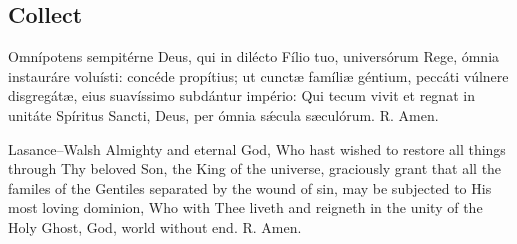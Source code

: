 \subsection{Collect}
\label{proper-collect}
\begin{latinproper}
Omnípotens sempitérne Deus, qui in dilécto Fílio tuo, universórum Rege, ómnia instauráre voluísti: concéde propítius; ut cunctæ famíliæ géntium, peccáti vúlnere disgregátæ, eius suavíssimo subdántur império: Qui tecum vivit et regnat in unitáte Spíritus Sancti, Deus, per ómnia sǽcula sæculórum. \textnormal{R.} Amen.
\end{latinproper}
\begin{englishwitness}{Lasance--Walsh}
Almighty and eternal God, Who hast wished to restore all things through Thy beloved Son, the King of the universe, graciously grant that all the familes of the Gentiles separated by the wound of sin, may be subjected to His most loving dominion, Who with Thee liveth and reigneth in the unity of the Holy Ghost, God, world without end. \textnormal{R.} Amen.
\end{englishwitness}
